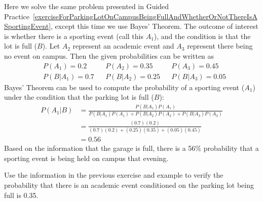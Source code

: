 \begin{examplewrap}
\begin{nexample}{Here we solve the same problem presented in Guided Practice~\ref{exerciseForParkingLotOnCampusBeingFullAndWhetherOrNotThereIsASportingEvent}, except this time we use Bayes' Theorem.}
The outcome of interest is whether there is a sporting event (call this $A_1$), and the condition is that the lot is full ($B$). Let $A_2$ represent an academic event and $A_3$ represent there being no event on campus. Then the given probabilities can be written as
\begin{align*}
&P(A_1) = 0.2 &&P(A_2) = 0.35 &&P(A_3) = 0.45 \\
&P(B | A_1) = 0.7 &&P(B | A_2) = 0.25 &&P(B | A_3) = 0.05
\end{align*}
Bayes' Theorem can be used to compute the probability of a sporting event ($A_1$) under the condition that the parking lot is full ($B$):
\begin{align*}
P(A_1 | B) &= \frac{P(B | A_1) P(A_1)}{P(B | A_1) P(A_1) + P(B | A_2) P(A_2) + P(B | A_3) P(A_3)} \\
		&= \frac{(0.7)(0.2)}{(0.7)(0.2) + (0.25)(0.35) + (0.05)(0.45)} \\
		&= 0.56 
\end{align*}
Based on the information that the garage is full, there is a 56\% probability that a sporting event is being held on campus that evening.
\end{nexample}
\end{examplewrap}

\D{\newpage}

\begin{exercisewrap}
\begin{nexercise} \label{exerciseForParkingLotOnCampusBeingFullAndWhetherOrNotThereIsAnAcademicEvent}
Use the information in the previous exercise and example to verify the probability that there is an academic event conditioned on the parking lot being full is 0.35.\footnotemark
\end{nexercise}
\end{exercisewrap}

